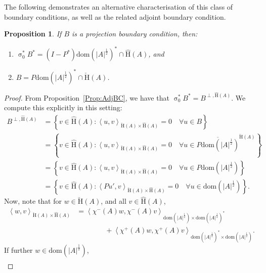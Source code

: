 \documentclass[a4paper,10pt,reqno]{amsart}
\newcommand{\sym}{\upsigma}
\newcommand{\dbrac}[1]{\left\{#1\right\}}
\newcommand{\modulus}[1]{|#1|}
\newcommand{\set}[1]{\dbrac{#1}}
\newcommand{\checkH}{\check{\mathrm{H}}}
\newcommand{\hatH}{\hat{\mathrm{H}}}
\newcommand{\dom}{\mathrm{dom}}
\newcommand{\close}[1]{\overline{#1}}
\newcommand{\inprod}[1]{\left\langle #1 \right\rangle}%
\newtheorem{proposition}[theorem]{Proposition}
\theoremstyle{definition}
\begin{document}
The following demonstrates an alternative characterisation of this class of boundary conditions, as well as the related adjoint boundary condition.

\begin{proposition}
\label{Prop:LocAdj}
If $B$ is a projection boundary condition, then:
\begin{enumerate}[label=(\roman*), labelwidth=0pt, labelindent=2pt, leftmargin=21pt]
\item \label{Prop:LocAdj:Adj}
      $\sym_0^\ast B^\ast =  (I - P^\ast) \dom(\modulus{A}^{\frac12})^{\ast}  \cap \hatH(A)$, and
\item \label{Prop:LocAdj:Int}
      $B = P\dom(\modulus{A}^{\frac12})^\ast \cap {\checkH(A)}$.
\end{enumerate}
\end{proposition}
\begin{proof}
From Proposition~\ref{Prop:AdjBC}, we have that $\sym_0^\ast B^\ast = B^{\perp, \hatH(A)}$.
We compute this explicitly in this setting:
\begin{align}
B^{\perp, \hatH(A)}
 & = \set{v \in \hatH(A): \inprod{u, v}_{\checkH(A) \times \hatH(A)} = 0 \quad \forall u \in B} \nonumber                                                 \\
 & = \set{v \in \hatH(A): \inprod{u, v}_{\checkH(A) \times \hatH(A)} = 0 \quad \forall u \in \close{P\dom(\modulus{A}^{\frac12})}^{\checkH(A)}} \nonumber \\
 & = \set{v \in \hatH(A): \inprod{u, v}_{\checkH(A) \times \hatH(A)} = 0 \quad \forall u \in P\dom(\modulus{A}^{\frac12})} \nonumber                      \\
 & = \set{v \in \hatH(A): \inprod{Pu', v}_{\checkH(A) \times \hatH(A)} = 0 \quad \forall u \in \dom(\modulus{A}^{\frac12})} \label{Eq:Adj}.
\end{align}
Now, note that for $w \in \checkH(A)$, and all $v \in \hatH(A)$,
\begin{equation}
\label{Eq:ProjSplit}
\begin{aligned}
\inprod{w,v}_{\checkH(A) \times \hatH(A)}
 & = \inprod{ \chi^-(A)w, \chi^-(A)v}_{\dom(\modulus{A}^{\frac12}) \times \dom(\modulus{A}^{\frac12})^\ast}                \\
 & \qquad\qquad+  \inprod{ \chi^+(A)w, \chi^+(A)v}_{\dom(\modulus{A}^{\frac12})^\ast  \times \dom(\modulus{A}^{\frac12})}.
\end{aligned}
\end{equation}
If further $w  \in \dom(\modulus{A}^{\frac12})$,
\begin{align*}

\end{align*}
\end{proof}
\end{document}

